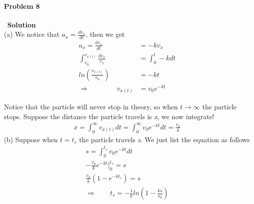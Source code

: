\documentclass[12pt,a4paper]{article}
\begin{document}
\paragraph{\large \textbf{Problem 8}}~{\textbf{Solution}}
\vspace{2mm}\\
\noindent (a) We notice that $a_x = \frac{dv_x}{dt}$, then we get
\begin{align*}
	a_x = \frac{dv_x}{dt} &= -kv_x\\
	\int_{v_0}^{v_{x(t)}} \frac{dv_x}{v_x} &= \int_0^t -kdt\\
	ln \left( \frac{v_{x(t)}}{v_0} \right) &= -kt\\
\Rightarrow \quad \quad \quad \quad v_{x(t)} &= v_0e^{-kt}
\end{align*}
\par Notice that the particle will never stop in theory, so when $t \rightarrow \infty$ the particle stops. Suppose the distance the particle travels is \textit{x}, we now integrate!
\begin{align*}
	x = \int_0^\infty v_{x(t)} dt = \int_0^\infty v_0e^{-kt} dt = \frac{v_0}{k}
\end{align*}
\noindent (b) Suppose when $t = t_s$ the particle travels \textit{s}. We just list the equation as follows
\begin{align*}
	s = \int_0^{t_s} v_0e^{-kt} dt\\
	-\frac{v_0}{k} e^{-kt}\rvert_0^{t_s} = s\\
	\frac{v_0}{k}\left( 1-e^{-kt_s} \right) = s\\
\Rightarrow\quad \quad t_s = -\frac{1}{k} ln\left( 1 - \frac{ks}{v_0} \right)
\end{align*}
\end{document}
